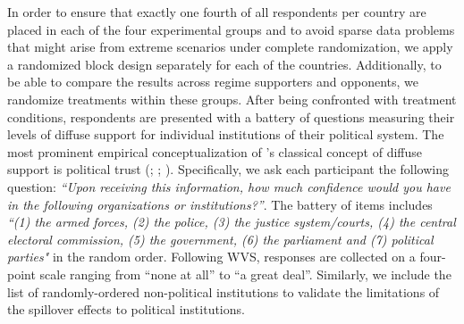 \documentclass[11pt, ngerman,english,a4]{article}
\begin{document}
In order to ensure that exactly one fourth of all respondents per country are placed in each of the four experimental groups and to avoid sparse data problems that might arise from extreme scenarios under complete randomization, we apply a randomized block design separately for each of the countries.
Additionally, to be able to compare the results across regime supporters and opponents, we randomize treatments within these groups. 
After being confronted with treatment conditions, respondents are presented with a battery of questions measuring their levels of diffuse support for individual institutions of their political system. 
The most prominent empirical conceptualization of \citet{Easton1975}'s classical concept of diffuse support is political trust (\citealt{Hooghe2012}; \citealt{Schneider2017}; \citealt{Frye2019}). 
Specifically, we ask each participant the following question: \textit{“Upon receiving this information, how much confidence would you have in the following organizations or institutions?”}. 
The battery of items includes \textit{“(1) the armed forces, (2) the police, (3) the justice system/courts, (4) the central electoral commission, (5) the government, (6) the parliament and (7) political parties"} in the random order. 
Following WVS, responses are collected on a four-point scale ranging from “none at all” to “a great deal”. 
Similarly, we include the list of randomly-ordered non-political institutions to validate the limitations of the spillover effects to political institutions. 
\end{document}
